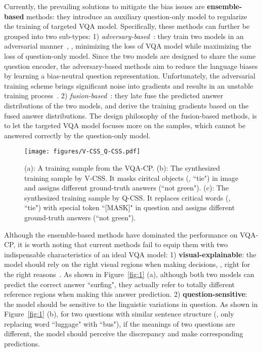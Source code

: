 \documentclass[10pt,twocolumn,letterpaper]{article}
\begin{document}
Currently, the prevailing solutions to mitigate the bias issues are \textbf{ensemble-based} methods: they introduce an auxiliary question-only model to regularize the training of targeted VQA model. Specifically, these methods can further be grouped into two sub-types: 1) \emph{adversary-based}~\cite{ramakrishnan2018overcoming, grand2019adversarial, belinkov2019don}: they train two models in an adversarial manner~\cite{goodfellow2014generative, chen2018zero}, \ie, minimizing the loss of VQA model while maximizing the loss of question-only model. Since the two models are designed to share the same question encoder, the adversary-based methods aim to reduce the language biases by learning a bias-neutral question representation. Unfortunately, the adversarial training scheme brings significant noise into gradients and results in an unstable training process~\cite{grand2019adversarial}. 2) \emph{fusion-based}~\cite{cadene2019rubi, clark2019don, mahabadi2019simple}: they late fuse the predicted answer distributions of the two models, and derive the training gradients based on the fused answer distributions. The design philosophy of the fusion-based methods, is to let the targeted VQA model focuses more on the samples, which cannot be answered correctly by the question-only model.

\begin{figure}[tbp]
	\centering
	\texttt{[image: figures/V-CSS\_Q-CSS.pdf]}
	\vspace{-0.5em}
	\caption{(a): A training sample from the VQA-CP. (b): The synthesized training sample by V-CSS. It masks ciritcal objects (\eg, ``tie") in image and assigns different ground-truth answers (``not green"). (c): The synthesized training sample by Q-CSS. It replaces critical words (\eg, ``tie") with special token ``[MASK]" in question and assigns different ground-truth answers (``not green").}
	\label{fig:2}
\end{figure}

Although the ensemble-based methods have dominated the performance on VQA-CP, it is worth noting that current methods fail to equip them with two indispensable characteristics of an ideal VQA model: 1) \textbf{visual-explainable}: the model should rely on the right visual regions when making decisions, \ie, right for the right reasons~\cite{ross2017right}. As shown in Figure~\ref{fig:1} (a), although both two models can predict the correct answer ``surfing", they actually refer to totally different reference regions when making this answer prediction. 2) \textbf{question-sensitive}: the model should be sensitive to the linguistic variations in question. As shown in Figure~\ref{fig:1} (b), for two questions with similar sentence structure (\eg,  only replacing word ``luggage" with ``bus"), if the meanings of two questions are different, the model should perceive the discrepancy and make corresponding predictions.
\end{document}
